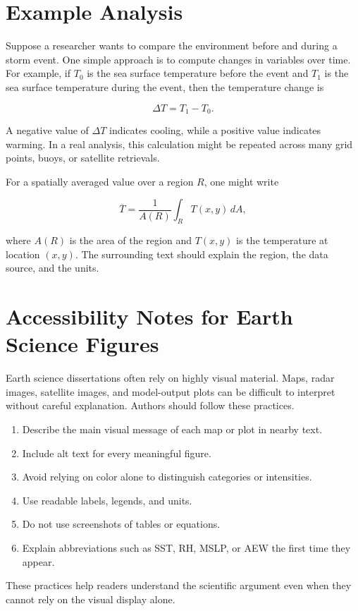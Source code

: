 \section{Example Analysis}
\label{sec:meas-analysis}

Suppose a researcher wants to compare the environment before and during a storm event. One simple approach is to compute changes in variables over time. For example, if \(T_0\) is the sea surface temperature before the event and \(T_1\) is the sea surface temperature during the event, then the temperature change is

\begin{equation}
\Delta T = T_1 - T_0.
\label{eq:temperature-change}
\end{equation}

A negative value of \(\Delta T\) indicates cooling, while a positive value indicates warming. In a real analysis, this calculation might be repeated across many grid points, buoys, or satellite retrievals.

For a spatially averaged value over a region \(R\), one might write

\begin{equation}
\overline{T}
=
\frac{1}{A(R)}
\int_R T(x,y)\,dA,
\label{eq:spatial-average}
\end{equation}

where \(A(R)\) is the area of the region and \(T(x,y)\) is the temperature at location \((x,y)\). The surrounding text should explain the region, the data source, and the units.

\section{Accessibility Notes for Earth Science Figures}
\label{sec:meas-accessibility}

Earth science dissertations often rely on highly visual material. Maps, radar images, satellite images, and model-output plots can be difficult to interpret without careful explanation. Authors should follow these practices.

\begin{enumerate}
  \item Describe the main visual message of each map or plot in nearby text.
  \item Include alt text for every meaningful figure.
  \item Avoid relying on color alone to distinguish categories or intensities.
  \item Use readable labels, legends, and units.
  \item Do not use screenshots of tables or equations.
  \item Explain abbreviations such as SST, RH, MSLP, or AEW the first time they appear.
\end{enumerate}

These practices help readers understand the scientific argument even when they cannot rely on the visual display alone.